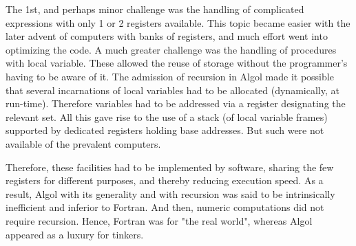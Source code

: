 The 1st, and perhaps minor challenge was the handling of complicated expressions
with only 1 or 2 registers available. This topic became easier with the later
advent of computers with banks of registers, and much effort went into optimizing
the code. A much greater challenge was the handling of procedures with local
variable. These allowed the reuse of storage without the programmer's having to
be aware of it. The admission of recursion in Algol made it possible that several
incarnations of local variables had to be allocated (dynamically, at run-time).
Therefore variables had to be addressed via a register designating the relevant
set. All this gave rise to the use of a stack (of local variable frames)
supported by dedicated registers holding base addresses. But such were not
available of the prevalent computers.

Therefore, these facilities had to be implemented by software, sharing the few
registers for different purposes, and thereby reducing execution speed. As a
result, Algol with its generality and with recursion was said to be intrinsically
inefficient and inferior to Fortran. And then, numeric computations did not
require recursion. Hence, Fortran was for "the real world", whereas Algol
appeared as a luxury for tinkers.
